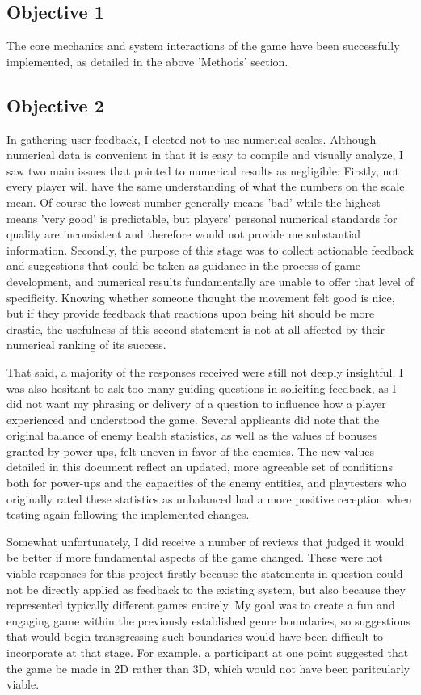 \documentclass[10pt,twocolumn]{article}
\begin{document}
\subsection{Objective 1}
The core mechanics and system interactions of the game have been successfully implemented, as detailed in the above 'Methods' section.

\subsection{Objective 2}
In gathering user feedback, I elected not to use numerical scales. Although numerical data is convenient in that it is easy to compile and visually analyze, I saw two main issues that pointed to numerical results as negligible: Firstly, not every player will have the same understanding of what the numbers on the scale mean. Of course the lowest number generally means 'bad' while the highest means 'very good' is predictable, but players' personal numerical standards for quality are inconsistent and therefore would not provide me substantial information. Secondly, the purpose of this stage was to collect actionable feedback and suggestions that could be taken as guidance in the process of game development, and numerical results fundamentally are unable to offer that level of specificity. Knowing whether someone thought the movement felt good is nice, but if they provide feedback that reactions upon being hit should be more drastic, the usefulness of this second statement is not at all affected by their numerical ranking of its success. 

That said, a majority of the responses received were still not deeply insightful. I was also hesitant to ask too many guiding questions in soliciting feedback, as I did not want my phrasing or delivery of a question to influence how a player experienced and understood the game. Several applicants did note that the original balance of enemy health statistics, as well as the values of bonuses granted by power-ups, felt uneven in favor of the enemies. The new values detailed in this document reflect an updated, more agreeable set of conditions both for power-ups and the capacities of the enemy entities, and playtesters who originally rated these statistics as unbalanced had a more positive reception when testing again following the implemented changes.

Somewhat unfortunately, I did receive a number of reviews that judged it would be better if more fundamental aspects of the game changed. These were not viable responses for this project firstly because the statements in question could not be directly applied as feedback to the existing system, but also because they represented typically different games entirely. My goal was to create a fun and engaging game within the previously established genre boundaries, so suggestions that would begin transgressing such boundaries would have been difficult to incorporate at that stage. For example, a participant at one point suggested that the game be made in 2D rather than 3D, which would not have been paritcularly viable. 
\end{document}
